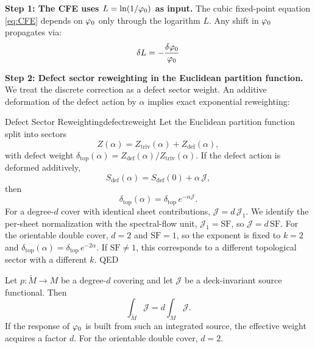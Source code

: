 \textbf{Step 1: The CFE uses $L = \ln(1/\varphi_0)$ as input.}
The cubic fixed-point equation \eqref{eq:CFE} depends on $\varphi_0$ only through 
the logarithm $L$. Any shift in $\varphi_0$ propagates via:
\begin{equation}
    \delta L = -\frac{\delta\varphi_0}{\varphi_0}
\end{equation}

\textbf{Step 2: Defect sector reweighting in the Euclidean partition function.}
We treat the discrete correction as a defect sector weight. An additive deformation of the
defect action by $\alpha$ implies exact exponential reweighting:
\begin{lemma}{Defect Sector Reweighting}{defectreweight}
Let the Euclidean partition function split into sectors
\begin{equation}
    Z(\alpha)=Z_{\mathrm{triv}}(\alpha)+Z_{\mathrm{def}}(\alpha),
\end{equation}
with defect weight $\delta_{\mathrm{top}}(\alpha)=Z_{\mathrm{def}}(\alpha)/Z_{\mathrm{triv}}(\alpha)$.
If the defect action is deformed additively,
\begin{equation}
    S_{\mathrm{def}}(\alpha)=S_{\mathrm{def}}(0)+\alpha\,\mathcal{J},
\end{equation}
then
\begin{equation}
    \delta_{\mathrm{top}}(\alpha)=\delta_{\mathrm{top}}\,e^{-\alpha\mathcal{J}}.
\end{equation}
For a degree-$d$ cover with identical sheet contributions, $\mathcal{J}=d\,\mathcal{J}_1$.
We identify the per-sheet normalization with the spectral-flow unit, $\mathcal{J}_1=\mathrm{SF}$,
so $\mathcal{J}=d\,\mathrm{SF}$. For the orientable double cover, $d=2$ and $\mathrm{SF}=1$,
so the exponent is fixed to $k=2$ and
$\delta_{\mathrm{top}}(\alpha)=\delta_{\mathrm{top}}\,e^{-2\alpha}$. If $\mathrm{SF}\neq 1$,
this corresponds to a different topological sector with a different $k$. \hfill QED
\end{lemma}

\begin{tcolorbox}[colback=blue!3, colframe=blue!40, 
    title={\textbf{Lemma (Cover-Degree Scaling of Deck-Invariant Response)}}, fonttitle=\bfseries\small]
Let $p:\widetilde{M}\to M$ be a degree-$d$ covering and let $\mathcal{J}$ be a deck-invariant
source functional. Then
\begin{equation}
    \int_{\widetilde{M}}\mathcal{J} = d \int_{M}\mathcal{J}.
\end{equation}
If the response of $\varphi_0$ is built from such an integrated source, the effective
weight acquires a factor $d$. For the orientable double cover, $d=2$.
\end{tcolorbox}

